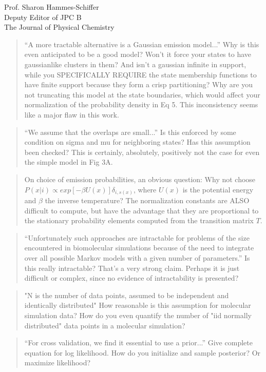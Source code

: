 \documentclass{letter}
\begin{document}
\begin{letter}{Prof. Sharon Hammes-Schiffer \\ Deputy Editor of JPC B \\ The Journal of Physical Chemistry}
\begin{quote}
``A more tractable alternative is a Gaussian emission model...''  Why is this even anticipated to be a good model?  Won't it force your states to have gaussianlike clusters in them?  And isn't a gaussian infinite in support, while you SPECIFICALLY REQUIRE the state membership functions to have finite support because they form a crisp partitioning?  Why are you not truncating this model at the state boundaries, which would affect your normalization of the probability density in Eq 5.  This inconsistency seems like a major flaw in this work.
\end{quote}

\begin{quote}
``We assume that the overlaps are small...''  Is this enforced by some condition on sigma and mu for neighboring states?  Has this assumption been checked?  This is certainly, absolutely, positively not the case for even the simple model in Fig 3A.
\end{quote}

\begin{quote}
On choice of emission probabilities, an obvious question: Why not choose $P(x|i) \propto exp[-\beta U(x)] \delta_{i,s(x)}$, where $U(x)$ is the potential energy and $\beta$ the inverse temperature?  The normalization constants are ALSO difficult to compute, but have the advantage that they are proportional to the stationary probability elements computed from the transition matrix $T$.
\end{quote}

\begin{quote}
``Unfortunately such approaches are intractable for problems of the size encountered in biomolecular simulations because of the need to integrate over all possible Markov models with a given number of parameters.''  Is this really intractable?  That's a very strong claim.  Perhaps it is just difficult or complex, since no evidence of intractability is presented?
\end{quote}

\begin{quote}
"N is the number of data points, assumed to be independent and identically distributed"  How reasonable is this assumption for molecular simulation data?  How do you even quantify the number of "iid normally distributed" data points in a molecular simulation?
\end{quote}

\begin{quote}
``For cross validation, we find it essential to use a prior...''  Give complete equation for log likelihood.  How do you initialize and sample posterior?  Or maximize likelihood?
\end{quote}



\end{letter}
\end{document}
